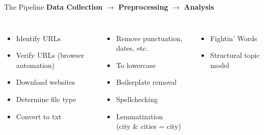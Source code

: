 \documentclass[12pt]{beamer}
\begin{document}
\begin{frame}{The Pipeline}
	\textbf{Data Collection} \hspace{2mm} $\rightarrow$ \hspace{2mm} \textbf{Preprocessing} \hspace{2mm} $\rightarrow$ \hspace{2mm} \textbf{Analysis}
\begin{columns}
	\vspace{5mm}
	\begin{itemize}
		\item Identify URLs
		\item Verify URLs (browser automation)
		\item Download websites
		\item Determine file type
		\item Convert to txt
	\end{itemize}		
	\vspace{5mm}
	\begin{itemize}
		\item Remove punctuation, dates, etc.
		\item To lowercase
		\item Boilerplate removal
		\item Spellchecking
		\item Lemmatization \\ (city \& cities = city)
	\end{itemize}
	\vspace{5mm}
	\begin{itemize}
		\item Fightin' Words
		\item Structural topic model
	\end{itemize}
\end{columns}
\end{frame}
\end{document}

